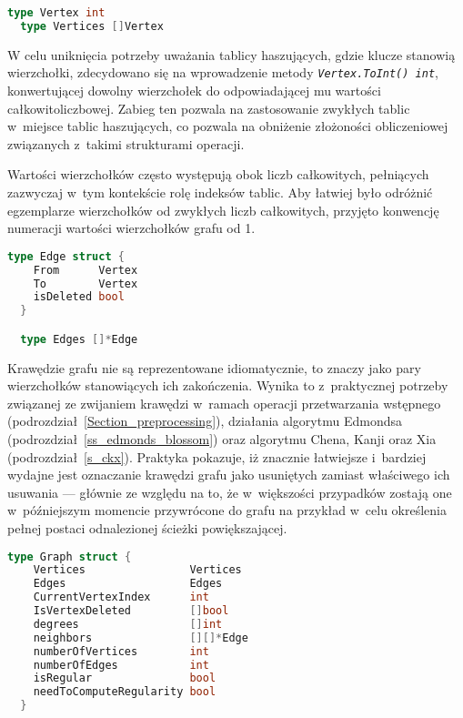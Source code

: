 \par{
  \begin{lstlisting}[language=go, caption=Typy reprezentujące wierzchołki grafu.]
  type Vertex int
  type Vertices []Vertex
  \end{lstlisting}
  W celu uniknięcia potrzeby uważania tablicy haszujących, gdzie klucze stanowią wierzchołki, zdecydowano się na wprowadzenie metody \textit{\lstinline{Vertex.ToInt() int}}, konwertującej dowolny wierzchołek do odpowiadającej mu wartości całkowitoliczbowej.
  Zabieg ten pozwala na zastosowanie zwykłych tablic w~miejsce tablic haszujących, co pozwala na obniżenie złożoności obliczeniowej związanych z~takimi strukturami operacji.

  Wartości wierzchołków często występują obok liczb całkowitych, pełniących zazwyczaj w~tym kontekście rolę indeksów tablic.
  Aby łatwiej było odróżnić egzemplarze wierzchołków od zwykłych liczb całkowitych, przyjęto konwencję numeracji wartości wierzchołków grafu od 1.
  \begin{lstlisting}[language=go, caption=Typy reprezentujące krawędzie grafu.]
  type Edge struct {
    From      Vertex
    To        Vertex
    isDeleted bool
  }

  type Edges []*Edge
  \end{lstlisting}

  Krawędzie grafu nie są reprezentowane idiomatycznie, to znaczy jako pary wierzchołków stanowiących ich zakończenia.
  Wynika to z~praktycznej potrzeby związanej ze zwijaniem krawędzi w~ramach operacji przetwarzania wstępnego (podrozdział~\ref{Section_preprocessing}), działania algorytmu Edmondsa (podrozdział~\ref{ss_edmonds_blossom}) oraz algorytmu Chena, Kanji oraz Xia (podrozdział~\ref{s_ckx}).
  Praktyka pokazuje, iż znacznie łatwiejsze i~bardziej wydajne jest oznaczanie krawędzi grafu jako usuniętych zamiast właściwego ich usuwania --- głównie ze względu na to, że w~większości przypadków zostają one w~późniejszym momencie przywrócone do grafu na przykład w~celu określenia pełnej postaci odnalezionej ścieżki powiększającej.

  \begin{lstlisting}[language=go, caption=Struktura reprezentująca graf.]
  type Graph struct {
    Vertices                Vertices
    Edges                   Edges
    CurrentVertexIndex      int
    IsVertexDeleted         []bool
    degrees                 []int
    neighbors               [][]*Edge
    numberOfVertices        int
    numberOfEdges           int
    isRegular               bool
    needToComputeRegularity bool
  }
  \end{lstlisting}

}
